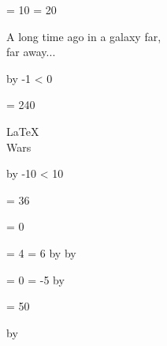 \documentclass{article}
\begin{document}
\vspace*{\fill}
\newpage
\vspace*{\fill}
\newpage

\newcount \timeback
\timeback = 10
\loop
\vspace*{\fill}
\newcount \tmp
\tmp = 20
\multiply \tmp \timeback
\begin{center}
  \color[RGB]{0, 0, \the\tmp}
  {    
      \fontsize{40}{48}
      \selectfont
      A long time ago in a galaxy far,\\ far away... \hphantom{ iiago in a galaxy far,}
  }
\end{center}
\vspace*{\fill}
\newpage
\advance \timeback by -1
\unless \ifnum \timeback < 0
\repeat
\color{yellow}

\newcount \fonts
\fonts = 240
\loop
  \BgThispage

  \fontsize{\the\fonts}{\the\fonts}
  \selectfont
  \vspace*{\fill}
  \begin{center}
    \LaTeX\\ 
    Wars
  \end{center}
  \vspace*{\fill}
  \newpage
  \advance \fonts by -10
\unless \ifnum \fonts < 10
\repeat



\timeback = 36

\newcount \timeforw
\timeforw = 0

\loop
  \BgThispage
  \vspace*{\fill}

  \newcount\tmp
  \tmp = 4
  \newcount \tmpp
  \tmpp = 6
  \multiply \tmp by \timeback
  \multiply \tmpp by \timeback

  \newcount \bb
  \bb = 0
  \newcount \diff
  \diff = -5
  \multiply \diff by \the\timeforw \relax
  
  \newcount \size
  \size = 50

  \advance \size by \the\diff \relax
  
\end{document}

